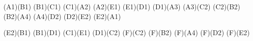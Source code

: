 

\Edge(A1)(B1)
\Edge(B1)(C1)
\Edge(C1)(A2)
\Edge(A2)(E1)
\Edge(E1)(D1)
\Edge(D1)(A3)
\Edge(A3)(C2)
\Edge(C2)(B2)
\Edge(B2)(A4)
\Edge(A4)(D2)
\Edge(D2)(E2)
\Edge(E2)(A1)

\Edge(E2)(B1)
\Edge(B1)(D1)
\Edge(C1)(E1)
\Edge(D1)(C2)
\Edge(F)(C2)
\Edge(F)(B2)
\Edge(F)(A4)
\Edge(F)(D2)
\Edge(F)(E2)
